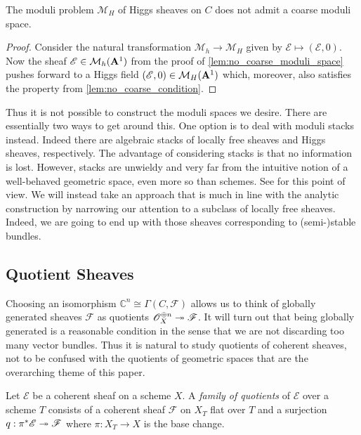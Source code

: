 \documentclass[12pt]{ociamthesis}  %
\begin{document}
\begin{corollary}
  The moduli problem $\mathcal M_H$ of Higgs sheaves on $C$ does not admit
  a coarse moduli space.
  \begin{proof}
    Consider the natural transformation $\mathcal M_h\to\mathcal M_H$
    given by $\mathscr E \mapsto (\mathscr E,0)$. Now the sheaf
    $\mathscr E\in\mathcal M_h(\mathbf{A}^{1}_{})$ from the proof of
    \ref{lem:no_coarse_moduli_space} pushes forward to a Higgs field
    $(\mathscr E,0)\in\mathcal M_H(\mathbf{A}^{1}_{})$ which, moreover,
    also satisfies the property from \ref{lem:no_coarse_condition}.
  \end{proof}
\end{corollary}
Thus it is not possible to construct the moduli spaces we desire.
There are essentially two ways to get around this. One option is to deal with
moduli stacks instead. Indeed there are algebraic stacks of locally
free sheaves and Higgs sheaves, respectively. The advantage of
considering stacks is that no information is lost. However, stacks
are unwieldy and very far from the intuitive notion of a well-behaved
geometric space, even more so than schemes. See \cite{cm2017} for this point of view.
We will instead take an
approach that is much in line with the analytic construction by narrowing
our attention to a subclass of locally free sheaves. Indeed, we are
going to end up with those sheaves corresponding to (semi-)stable
bundles.

\subsection{Quotient Sheaves} 

Choosing an isomorphism $\mathbb C^n \cong \Gamma(C,\mathscr F)$
allows us to think of globally generated sheaves $\mathscr F$
as quotients $\mathscr O_X^{\oplus n} \twoheadrightarrow \mathscr F$.
It will turn out that being globally generated is a reasonable
condition in the sense that we are not discarding too many
vector bundles. Thus it is natural to study quotients of coherent sheaves,
not to be confused with the quotients of geometric spaces that
are the overarching theme of this paper.

\begin{definition}
  Let $\mathscr E$ be a coherent sheaf on a scheme $X$.
  A \emph{family of quotients} of $\mathscr E$ over a scheme $T$
  consists of a coherent sheaf $\mathscr F$ on $X_T$ flat over $T$ and a
  surjection $q:\pi^*\mathscr E\twoheadrightarrow\mathscr F$ where
  $\pi : X_T \to X$ is the base change.
\end{definition}
\end{document}
